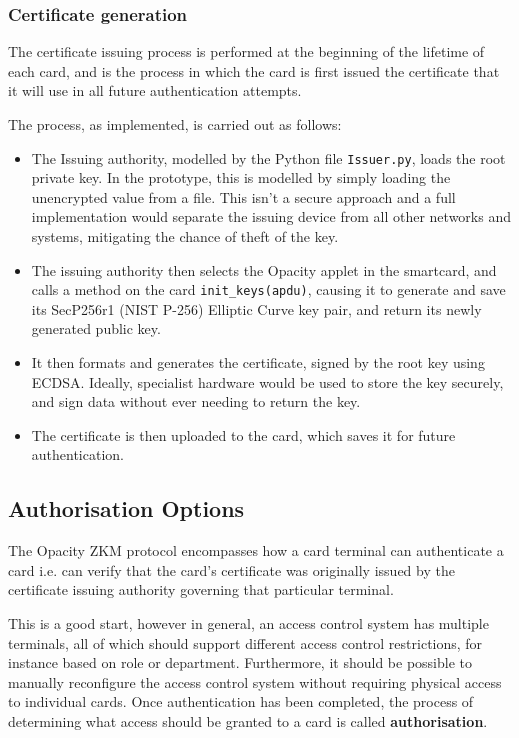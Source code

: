 \documentclass[12pt,a4paper]{article}
\begin{document}
\subsubsection{Certificate generation}
\label{subsec:certificates}

The certificate issuing process is performed at the beginning of the lifetime of each card, and is the process in which the card is first issued the certificate that it will use in all future authentication attempts.

The process, as implemented, is carried out as follows:
\begin{itemize}
	\item The Issuing authority, modelled by the Python file \verb|Issuer.py|, loads the root private key. In the prototype, this is modelled by simply loading the unencrypted value from a file. This isn't a secure approach and a full implementation would separate the issuing device from all other networks and systems, mitigating the chance of theft of the key. %
	
	\item The issuing authority then selects the Opacity applet in the smartcard, and calls a method on the card \verb|init_keys(apdu)|, causing it to generate and save its SecP256r1 (NIST P-256) Elliptic Curve key pair, and return its newly generated public key.
	
	\item It then formats and generates the certificate, signed by the root key using ECDSA. Ideally, specialist hardware would be used to store the key securely, and sign data without ever needing to return the key.	
	
	\item The certificate is then uploaded to the card, which saves it for future authentication.
\end{itemize}


\subsection{Authorisation Options}
The Opacity ZKM protocol encompasses how a card terminal can authenticate a card i.e. can verify that the card's certificate was originally issued by the certificate issuing authority governing that particular terminal. 

This is a good start, however in general, an access control system has multiple terminals, all of which should support different access control restrictions, for instance based on role or department. Furthermore, it should be possible to manually reconfigure the access control system without requiring physical access to individual cards. Once authentication has been completed, the process of determining what access should be granted to a card is called \textbf{authorisation}.
\end{document}
